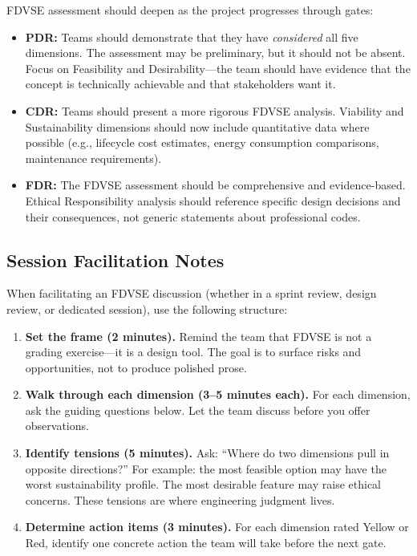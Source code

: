FDVSE assessment should deepen as the project progresses through gates:

\begin{itemize}[nosep,leftmargin=1.5em]
\item \textbf{PDR:} Teams should demonstrate that they have \emph{considered} all five dimensions. The assessment may be preliminary, but it should not be absent. Focus on Feasibility and Desirability---the team should have evidence that the concept is technically achievable and that stakeholders want it.

\item \textbf{CDR:} Teams should present a more rigorous FDVSE analysis. Viability and Sustainability dimensions should now include quantitative data where possible (e.g., lifecycle cost estimates, energy consumption comparisons, maintenance requirements).

\item \textbf{FDR:} The FDVSE assessment should be comprehensive and evidence-based. Ethical Responsibility analysis should reference specific design decisions and their consequences, not generic statements about professional codes.
\end{itemize}

\subsection{Session Facilitation Notes}

When facilitating an FDVSE discussion (whether in a sprint review, design review, or dedicated session), use the following structure:

\begin{enumerate}[nosep,leftmargin=1.5em]
\item \textbf{Set the frame (2 minutes).} Remind the team that FDVSE is not a grading exercise---it is a design tool. The goal is to surface risks and opportunities, not to produce polished prose.

\item \textbf{Walk through each dimension (3--5 minutes each).} For each dimension, ask the guiding questions below. Let the team discuss before you offer observations.

\item \textbf{Identify tensions (5 minutes).} Ask: ``Where do two dimensions pull in opposite directions?'' For example: the most feasible option may have the worst sustainability profile. The most desirable feature may raise ethical concerns. These tensions are where engineering judgment lives.

\item \textbf{Determine action items (3 minutes).} For each dimension rated Yellow or Red, identify one concrete action the team will take before the next gate.
\end{enumerate}

